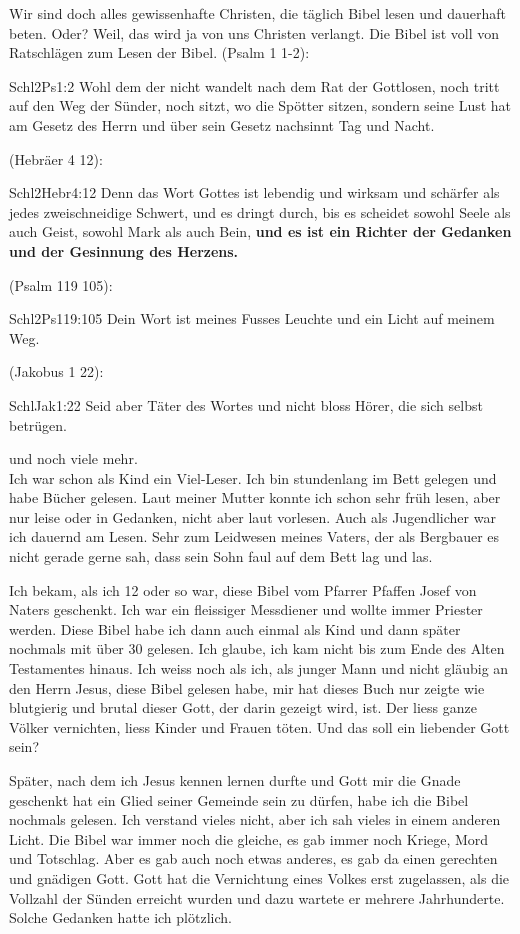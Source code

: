 \documentclass{../inc/mybib}
\begin{document}
Wir sind doch alles gewissenhafte Christen, die täglich Bibel lesen und dauerhaft beten. Oder? Weil, das wird ja von uns Christen verlangt. Die Bibel ist voll von Ratschlägen zum Lesen der Bibel. 
(Psalm 1 1-2):
\begin{bibeltext}{Schl2}{Ps}{1:2}
Wohl dem der nicht wandelt nach dem Rat der Gottlosen, noch tritt auf den Weg der Sünder, noch sitzt, wo die Spötter sitzen, sondern seine Lust hat am Gesetz des Herrn und über sein Gesetz nachsinnt Tag und Nacht.
\end{bibeltext}
(Hebräer 4 12):
\begin{bibeltext}{Schl2}{Hebr}{4:12}
Denn das Wort Gottes ist lebendig und wirksam und schärfer als jedes zweischneidige Schwert, und es dringt durch, bis es scheidet sowohl Seele als auch Geist, sowohl Mark als auch Bein, \textbf{und es ist ein Richter der Gedanken und der Gesinnung des Herzens.}
\end{bibeltext}
(Psalm 119 105):
\begin{bibeltext}{Schl2}{Ps}{119:105}
Dein Wort ist meines Fusses Leuchte und ein Licht auf meinem Weg.
\end{bibeltext}
(Jakobus 1 22):
\begin{bibeltext}{Schl}{Jak}{1:22}
Seid aber Täter des Wortes und nicht bloss Hörer, die sich selbst betrügen.
\end{bibeltext}
und noch viele mehr.\\
Ich war schon als Kind ein Viel-Leser. Ich bin stundenlang im Bett gelegen und habe Bücher gelesen. Laut meiner Mutter konnte ich schon sehr früh lesen, aber nur leise oder in Gedanken, nicht aber laut vorlesen. Auch als Jugendlicher war ich dauernd am Lesen. Sehr zum Leidwesen meines Vaters, der als Bergbauer es nicht gerade gerne sah, dass sein Sohn faul auf dem Bett lag und las.

Ich bekam, als ich 12 oder so war, diese Bibel vom Pfarrer Pfaffen Josef von Naters geschenkt. Ich war ein fleissiger Messdiener und wollte immer Priester werden. Diese Bibel habe ich dann auch einmal als Kind und dann später nochmals mit über 30 gelesen. Ich glaube, ich kam nicht bis zum Ende des Alten Testamentes hinaus. Ich weiss noch als ich, als  junger Mann und nicht gläubig an den Herrn Jesus, diese Bibel gelesen habe, mir hat dieses Buch nur zeigte wie blutgierig und brutal dieser Gott, der darin gezeigt wird, ist. Der liess ganze Völker vernichten, liess Kinder und Frauen töten. Und das soll ein liebender Gott sein?

Später, nach dem ich Jesus kennen lernen durfte und Gott mir die Gnade geschenkt hat ein Glied seiner Gemeinde sein zu dürfen, habe ich die Bibel nochmals gelesen. Ich verstand vieles nicht, aber ich sah vieles in einem anderen Licht. Die Bibel war immer noch die gleiche, es gab immer noch Kriege, Mord und Totschlag. Aber es gab auch noch etwas anderes, es gab da einen gerechten und gnädigen Gott. Gott hat die Vernichtung eines Volkes erst zugelassen, als die Vollzahl der Sünden erreicht wurden und dazu wartete er mehrere Jahrhunderte. Solche Gedanken hatte ich plötzlich.
\end{document}
